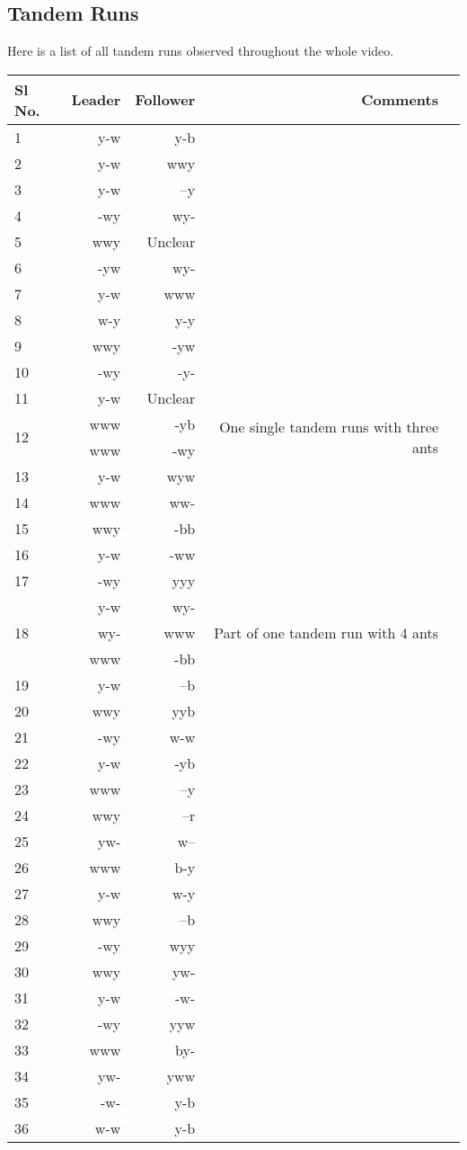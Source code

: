 \documentclass{scrartcl}
\begin{document}
\subsection{Tandem Runs}
Here is a list of all tandem runs observed throughout the whole video.
\begin{table}[H]\centering
\scriptsize
\begin{tabular}{lrrrr}\toprule
Sl No. &Leader &Follower &Comments \\\midrule
1 &y-w &y-b & \\
2 &y-w &wwy & \\
3 &y-w &--y & \\
4 &-wy &wy- & \\
5 &wwy &Unclear & \\
6 &-yw &wy- & \\
7 &y-w &www & \\
8 &w-y &y-y & \\
9 &wwy &-yw & \\
10 &-wy &-y- & \\
11 &y-w &Unclear & \\
\multirow{2}{*}{12} &www &-yb &\multirow{2}{*}{One single tandem runs with three ants} \\
&www &-wy & \\
13 &y-w &wyw & \\
14 &www &ww- & \\
15 &wwy &-bb & \\
16 &y-w &-ww & \\
17 &-wy &yyy & \\
\multirow{3}{*}{18} &y-w &wy- &\multirow{3}{*}{Part of one tandem run with 4 ants} \\
&wy- &www & \\
&www &-bb & \\
19 &y-w &--b & \\
20 &wwy &yyb & \\
21 &-wy &w-w & \\
22 &y-w &-yb & \\
23 &www &--y & \\
24 &wwy &--r & \\
25 &yw- &w-- & \\
26 &www &b-y & \\
27 &y-w &w-y & \\
28 &wwy &--b & \\
29 &-wy &wyy & \\
30 &wwy &yw- & \\
31 &y-w &-w- & \\
32 &-wy &yyw & \\
33 &www &by- & \\
34 &yw- &yww & \\
35 &-w- &y-b & \\
36 &w-w &y-b & \\
\bottomrule
\end{tabular}
\end{table}
\end{document}
